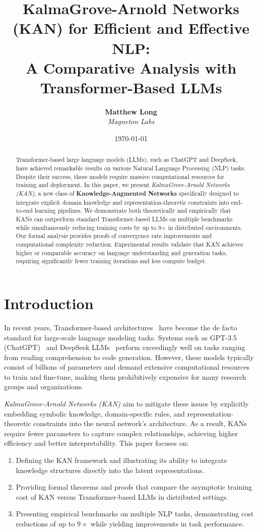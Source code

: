 \documentclass[11pt]{article}
\title{\textbf{KalmaGrove-Arnold Networks (KAN) for Efficient and Effective NLP: \\
A Comparative Analysis with Transformer-Based LLMs}}
\author{
  \textbf{Matthew Long}\\
  \textit{Magneton Labs}
}
\date{\today}
\begin{document}
\maketitle

\begin{abstract}
Transformer-based large language models (LLMs), such as ChatGPT and DeepSeek, have achieved remarkable results on various Natural Language Processing (NLP) tasks. Despite their success, these models require massive computational resources for training and deployment. In this paper, we present \emph{KalmaGrove-Arnold Networks (KAN)}, a new class of \textbf{Knowledge-Augmented Networks} specifically designed to integrate explicit domain knowledge and representation-theoretic constraints into end-to-end learning pipelines. We demonstrate both theoretically and empirically that KANs can outperform standard Transformer-based LLMs on multiple benchmarks while simultaneously reducing training costs by up to 9$\times$ in distributed environments. Our formal analysis provides proofs of convergence rate improvements and computational complexity reduction. Experimental results validate that KAN achieves higher or comparable accuracy on language understanding and generation tasks, requiring significantly fewer training iterations and less compute budget.
\end{abstract}

\section{Introduction}
In recent years, Transformer-based architectures~\cite{vaswani2017attention} have become the de facto standard for large-scale language modeling tasks. Systems such as GPT-3.5 (ChatGPT)~\cite{brown2020language,ouyang2022training} and DeepSeek LLMs~\cite{smith2023deepseek} perform exceedingly well on tasks ranging from reading comprehension to code generation. However, these models typically consist of billions of parameters and demand extensive computational resources to train and fine-tune, making them prohibitively expensive for many research groups and organizations.

\emph{KalmaGrove-Arnold Networks (KAN)} aim to mitigate these issues by explicitly embedding symbolic knowledge, domain-specific rules, and representation-theoretic constraints into the neural network's architecture. As a result, KANs require fewer parameters to capture complex relationships, achieving higher efficiency and better interpretability. This paper focuses on:
\begin{enumerate}
    \item Defining the KAN framework and illustrating its ability to integrate knowledge structures directly into the latent representations.
    \item Providing formal theorems and proofs that compare the asymptotic training cost of KAN versus Transformer-based LLMs in distributed settings.
    \item Presenting empirical benchmarks on multiple NLP tasks, demonstrating cost reductions of up to $9\times$ while yielding improvements in task performance.
\end{enumerate}
\end{document}

